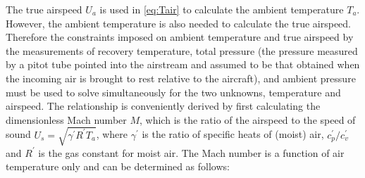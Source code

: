 \documentclass[
]{book}
\begin{document}
The true airspeed \(U_a\) is used in \eqref{eq:Tair} to calculate the ambient temperature \(T_a\). However, the ambient temperature is also needed to calculate the true airspeed. Therefore the constraints imposed on ambient temperature and true airspeed by the measurements of recovery temperature, total pressure (the pressure measured by a pitot tube pointed into the airstream and assumed to be that obtained when the incoming air is brought to rest relative to the aircraft), and ambient pressure must be used to solve simultaneously for the two unknowns, temperature and airspeed.
The relationship is conveniently derived by first calculating the dimensionless Mach number \(M\), which is the ratio of the airspeed to the speed of sound \(U_{s}=\sqrt{\gamma^{\prime}R^{\prime}T_{a}}\), where \(\gamma^\prime\) is the ratio of specific heats of (moist) air, \(c_p^\prime /c_v^\prime\) and \(R^\prime\) is the gas constant for moist air. The Mach number is a function of air temperature only and can be determined as follows:
\end{document}
